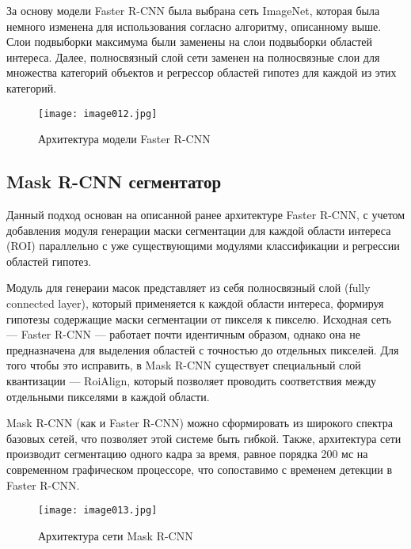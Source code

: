 За основу модели Faster R-CNN была выбрана сеть ImageNet, которая была немного изменена для использования согласно алгоритму, описанному выше. Слои подвыборки максимума были заменены на слои подвыборки областей интереса. Далее, полносвязный слой сети заменен на полносвязные слои для множества категорий объектов и регрессор областей гипотез для каждой из этих категорий.
\begin{figure}[htbp]
\centering
\texttt{[image: image012.jpg]}
\caption{Архитектура модели Faster R-CNN\cite{fifteen}}%
\label{fig:how-to-do-research}
\end{figure}

\subsection{Mask R-CNN сегментатор}

Данный подход основан на описанной ранее архитектуре Faster R-CNN, с учетом добавления модуля генерации маски сегментации для каждой области интереса (ROI) параллельно с уже существующими модулями классификации и регрессии областей гипотез. 

Модуль для генераии масок представляет из себя полносвязный слой (fully connected layer), который применяется к каждой области интереса, формируя гипотезы содержащие маски сегментации от пикселя к пикселю. Исходная сеть — Faster R-CNN — работает почти идентичным образом, однако она не предназначена для выделения областей с точностью до отдельных пикселей. Для того чтобы это исправить, в Mask R-CNN существует специальный слой квантизации — RoiAlign, который позволяет проводить соответствия между отдельными пикселями в каждой области.

Mask R-CNN (как и Faster R-CNN) можно сформировать из широкого спектра базовых сетей, что позволяет этой системе быть гибкой. Также, архитектура сети производит сегментацию одного кадра за время, равное порядка 200 мс на современном графическом процессоре, что сопоставимо с временем детекции в Faster R-CNN\cite{sixteen}.
\begin{figure}[htbp]
\centering
\texttt{[image: image013.jpg]}
\caption{Архитектура сети Mask R-CNN\cite{sixteen}}%
\label{fig:how-to-do-research}
\end{figure}

